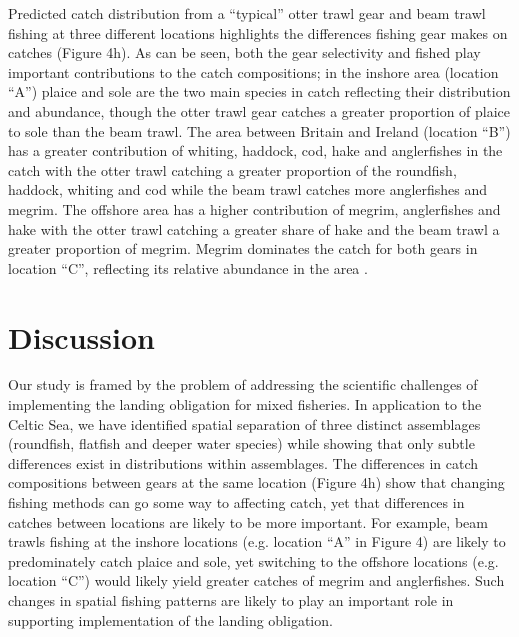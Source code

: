 \documentclass[fleqn,10pt]{wlscirep}
\begin{document}
\begin{linenumbers}
Predicted catch distribution from a ``typical'' otter trawl gear and beam trawl
fishing at three different locations highlights the differences fishing gear
makes on catches (Figure 4h). As can be seen, both the gear selectivity and
 fished play important contributions to the
catch compositions; in the inshore area (location ``A'') plaice and sole are the
two main species in  catch reflecting their distribution and
abundance, though the otter trawl gear catches a greater proportion of plaice
to sole than the beam trawl.  The area between Britain and Ireland (location
``B'') has a greater contribution of whiting, haddock, cod, hake and anglerfishes
in the catch with the otter trawl catching a greater proportion of the
roundfish, haddock, whiting and cod while the beam trawl catches more
anglerfishes and megrim. The offshore area has a higher contribution of
megrim, anglerfishes and hake with the otter trawl catching a greater share of
hake and the beam trawl a greater proportion of megrim. Megrim dominates the
catch for both gears in location ``C'', reflecting its relative abundance in the
area .  \\

\section*{Discussion\\}

Our study is framed by the problem of addressing the scientific challenges of
implementing the landing obligation for mixed fisheries. In application to the
Celtic Sea, we have identified spatial separation of three distinct
assemblages (roundfish, flatfish and deeper water species) while showing
that only subtle differences exist in distributions within assemblages. The
differences in catch compositions between gears at the same location (Figure
4h) show that changing fishing methods can go some way to affecting catch, yet
that differences in catches between locations are likely to be more important.
For example, beam trawls fishing at the inshore locations (e.g. location ``A'' in
Figure 4) are likely to predominately catch plaice and sole, yet switching to
the offshore locations (e.g. location ``C'') would likely yield greater catches
of megrim and anglerfishes.  Such changes in spatial fishing patterns are
likely to play an important role in supporting implementation of the landing
obligation.\\


\end{linenumbers}
\end{document}
